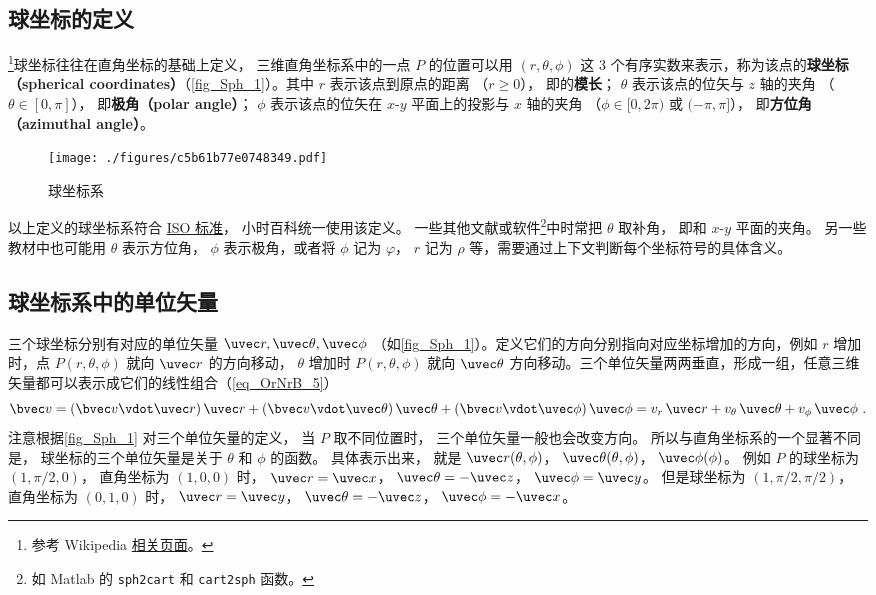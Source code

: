 

\subsection{球坐标的定义}

\footnote{参考 Wikipedia \href{https://en.wikipedia.org/wiki/Spherical_coordinate_system}{相关页面}。}球坐标往往在直角坐标的基础上定义， 三维直角坐标系中的一点 $P$ 的位置可以用 $(r,\theta ,\phi )$ 这 3 个有序实数来表示，称为该点的\textbf{球坐标（spherical coordinates）}（\autoref{fig_Sph_1}）。其中 $r$ 表示该点到原点的距离 （$r \geqslant 0$）， 即的\textbf{模长}； $\theta$ 表示该点的位矢与 $z$ 轴的夹角 （$\theta  \in [0,\pi]$）， 即\textbf{极角（polar angle）}； $\phi$ 表示该点的位矢在 $x$-$y$ 平面上的投影与 $x$ 轴的夹角 （$\phi  \in [0,2\pi)$ 或 $(- \pi,\pi]$）， 即\textbf{方位角（azimuthal angle）}。

\begin{figure}[ht]
\centering
\texttt{[image: ./figures/c5b61b77e0748349.pdf]}
\caption{球坐标系}\label{fig_Sph_1}
\end{figure}

以上定义的球坐标系符合 \href{https://www.iso.org/standard/64973.html}{ISO 标准}， 小时百科统一使用该定义。 一些其他文献或软件\footnote{如 Matlab 的 \lstinline|sph2cart| 和 \lstinline|cart2sph| 函数。}中时常把 $\theta$ 取补角， 即和 $x$-$y$ 平面的夹角。 另一些教材中也可能用 $\theta $ 表示方位角， $\phi $ 表示极角，或者将 $\phi $ 记为 $\varphi $，  $r$ 记为 $\rho $ 等，需要通过上下文判断每个坐标符号的具体含义。

\subsection{球坐标系中的单位矢量}
三个球坐标分别有对应的单位矢量 $\uvec r, \uvec\theta, \uvec\phi$ （如\autoref{fig_Sph_1}）。定义它们的方向分别指向对应坐标增加的方向，例如 $r$ 增加时，点 $P(r,\theta ,\phi )$ 就向 $\uvec r$ 的方向移动， $\theta$ 增加时 $P(r,\theta ,\phi )$ 就向 $\uvec \theta$ 方向移动。三个单位矢量两两垂直，形成一组，任意三维矢量都可以表示成它们的线性组合（\autoref{eq_OrNrB_5}）
\begin{equation}\label{eq_Sph_1}
\bvec v = (\bvec v \vdot \uvec r)\,\uvec r + (\bvec v \vdot \uvec \theta)\,\uvec \theta  + (\bvec v \vdot \uvec \phi)\,\uvec \phi  = v_r \,\uvec r + v_\theta \,\uvec \theta  + v_\phi \,\uvec \phi ~.
\end{equation}
注意根据\autoref{fig_Sph_1} 对三个单位矢量的定义， 当 $P$ 取不同位置时， 三个单位矢量一般也会改变方向。 所以与直角坐标系的一个显著不同是， 球坐标的三个单位矢量是关于 $\theta$ 和 $\phi$ 的函数。 具体表示出来， 就是 $\uvec r(\theta ,\phi )$，  $\uvec \theta (\theta ,\phi )$，  $\uvec \phi (\phi )$。 
例如 $P$ 的球坐标为 $(1, \pi/2, 0)$， 直角坐标为 $(1, 0, 0)$ 时，
$\uvec r = \uvec x$， $\uvec \theta  =  - \uvec z$， $\uvec \phi  = \uvec y$。 
但是球坐标为 $(1, \pi/2, \pi/2)$， 直角坐标为 $(0, 1, 0)$ 时， $\uvec r = \uvec y$， $\uvec \theta  =  - \uvec z$， $\uvec \phi  =  - \uvec x$。

